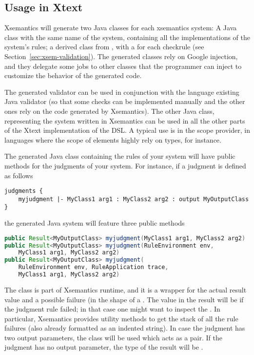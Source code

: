 \subsection{Usage in Xtext}

Xsemantics will generate two Java classes for each xsemantics system:
A Java class with the same name of the system, containing all the
implementations of the system's rules; a derived class from
, with a \checkm{} for each checkrule (see
Section~\ref{sec:xsem-validation}).
The generated classes rely on Google injection, and they delegate some jobs to
other classes that the programmer can inject to customize the behavior of the
generated code.

The generated validator can be used in conjunction with the language existing
Java validator (so that some checks can be implemented manually and the other
ones rely on the code generated by Xsemantics).  The other Java class,
representing the system written in Xsemantics can be used in all the other parts
of the Xtext implementation of the DSL.  A typical use is in the scope provider,
in languages where the scope of elements highly rely on types, for instance.

The generated Java class containing the rules of your system will have
public methods for the judgments of your system.  For instance, if a judgment is
defined as follows


\begin{lstlisting}[language=xsemantics] 
judgments {
	myjudgment |- MyClass1 arg1 : MyClass2 arg2 : output MyOutputClass
}
\end{lstlisting}

\noindent
the generated Java system will feature three public methods

\begin{lstlisting}[language=Java] 
public Result<MyOutputClass> myjudgment(MyClass1 arg1, MyClass2 arg2)
public Result<MyOutputClass> myjudgment(RuleEnvironment env,
	MyClass1 arg1, MyClass2 arg2)
public Result<MyOutputClass> myjudgment(
	RuleEnvironment env, RuleApplication trace,
	MyClass1 arg1, MyClass2 arg2)
\end{lstlisting}

The class  is part of Xsemantics runtime, and it is a wrapper for
the actual result value and a possible failure (in the shape of a \failedexc.
The value in the result will be  if the judgment rule failed; in that
case one might want to inspect the \failedexc.
In particular, Xsemantics provides utility methods to get the stack of all the
rule failures (also already formatted as an indented string).
In case the judgment has two output parameters, the class
 will be used which acts as a pair.
If the judgment has no output parameter, the type of the result will
be .

